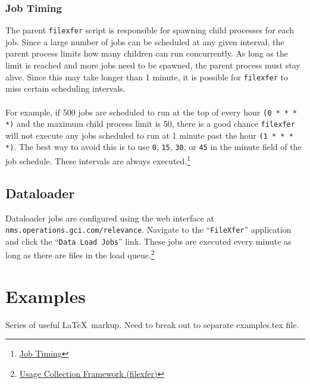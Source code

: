 \documentclass[12pt,letterpaper,dvips]{article}
\begin{document}
\subsubsection{Job Timing}
The parent \texttt{filexfer} script is responsible for spawning
child processes for each job. Since a large number of jobs can be
scheduled at any given interval, the parent process limits how
many children can run concurrently.  As long as the limit is
reached and more jobs need to be spawned, the parent process must
stay alive. Since this may take longer than 1 minute, it is
possible for \texttt{filexfer} to miss certain scheduling
intervals.\\
\\
For example, if 500 jobs are scheduled to run at the top of every
hour \texttt{(0 * * * *)} and the maximum child process limit is
50, there is a good chance \texttt{filexfer} will not execute any
jobs scheduled to run at 1 minute past the hour
\texttt{(1 * * * *)}.  The best way to avoid this is to use
\texttt{0}, \texttt{15}, \texttt{30}, or \texttt{45} in the
minute field of the job schedule.  These intervals are always
executed.\footnote{\href{http://oss-wiki.operations.gci.com/dev/index.php/Scheduling\_Usage\_Collection\_Jobs}{Job
    Timing}}




\subsection{Dataloader}
Dataloader jobs are configured using the web interface at
\texttt{nms.operations.gci.com/relevance}. Navigate to the
``\texttt{FileXfer}'' application and click the
``\texttt{Data Load Jobs}'' link. These jobs are executed every
minute as long as there are files in the load queue.\footnote{\href{http://oss-wiki.operations.gci.com/dev/index.php/Usage\_Collection\_Framework\_(filexfer)}{Usage Collection Framework (filexfer)}}



\newpage
\section{Examples}
Series of useful \LaTeX\ markup. Need to break out to 
separate examples.tex file.
\end{document}
